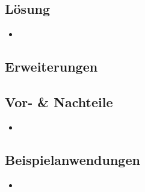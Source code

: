 \subsection*{Lösung}

\begin{itemize}
	\item 
\end{itemize}

\subsection*{Erweiterungen}


\subsection*{Vor- \& Nachteile}
\begin{itemize}
	\item 
\end{itemize}

\subsection*{Beispielanwendungen}
\begin{itemize}
	\item 
\end{itemize}